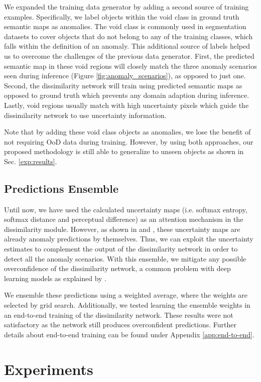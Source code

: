\documentclass[final]{cvpr}
\begin{document}
We expanded the training data generator by adding a second source of training examples.
Specifically, we label objects within the void class in ground truth semantic maps as anomalies. The void class is commonly used in segmentation datasets \cite{Cityscapes} to cover objects that do not belong to any of the training classes, which falls within the definition of an anomaly. 
This additional source of labels helped us to overcome the challenges of the previous data generator. 
First, the predicted semantic map in these void regions will closely match the three anomaly scenarios seen during inference (Figure \ref{fig:anomaly_scenarios}), as opposed to just one. 
Second, the dissimilarity network will train using predicted semantic maps as opposed to ground truth which prevents any domain adaption during inference. 
Lastly, void regions usually match with high uncertainty pixels which guide the dissimilarity network to use uncertainty information.

Note that by adding these void class objects as anomalies, we lose the benefit of not requiring OoD data during training. However, by using both approaches, our proposed methodology is still able to generalize to unseen objects as shown in Sec. \ref{exp:results}.



\subsection{Predictions Ensemble}
\label{met:ensemble}
Until now, we have used the calculated uncertainty maps (i.e. softmax entropy, softmax distance and perceptual difference) as an attention mechanism in the dissimilarity module. 
However, as shown in \cite{meta} and \cite{meta_ood}, these uncertainty maps are already anomaly predictions by themselves. 
Thus, we can exploit the uncertainty estimates to complement the output of the dissimilarity network in order to detect all the anomaly scenarios. 
With this ensemble, we mitigate any possible overconfidence of the dissimilarity network, a common problem with deep learning models as explained by \cite{Calibration}. 

We ensemble these predictions using a weighted average, where the weights are selected by grid search. 
Additionally, we tested learning the ensemble weights in an end-to-end training of the dissimilarity network. These results were not satisfactory as the network still produces overconfident predictions. Further details about end-to-end training can be found under Appendix \ref{app:end-to-end}. \section{Experiments}
\label{experiments}
\end{document}
